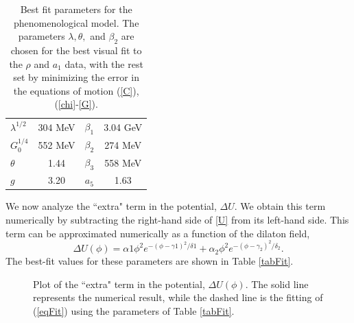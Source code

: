 \documentclass[aps,prd,12pt,nofootinbib]{revtex4}
\newcommand{\be}{\begin{equation}}
\newcommand{\ee}{\end{equation}}
\begin{document}
\begin{table}[htb]
\begin{center}
\begin{tabular}{| l | c || c | c | }
\hline
  $\lambda^{1/2}$ & $304$ MeV & $\beta_1$ & 3.04 GeV  \\
  $G_0^{1/4}$ & 552 MeV & $\beta_2$ & 274 MeV \\
  $ \theta $& 1.44 & $\beta_3$ & 558 MeV \\
  $g $& 3.20 & $a_5$ & 1.63 \\
  \hline
\end{tabular}
\caption{Best fit parameters for the phenomenological model. 
The parameters $\lambda, \theta,$ and $ \beta_2$ are chosen for the best visual fit to the $\rho$ and $a_1$ data, with the rest set by minimizing the error in the equations of motion (\ref{C}), (\ref{chi}-\ref{G}). }
\label{tabParam}
\end{center}
\end{table}


We now analyze the ``extra" term in the potential, $\Delta U$. 
We obtain this term numerically by subtracting the right-hand side of \ref{U} from its left-hand side.
This term can be approximated numerically as a function of the dilaton field, 
\be
\Delta U\left(\phi\right) = \alpha1 \phi^2 e^{-\left(\phi-\gamma1\right)^2/\delta1 } +   \alpha_2 \phi^2 e^{-\left(\phi-\gamma_2\right)^2/\delta_2 } .
\label{eqFit}
\ee
The best-fit values for these parameters are shown in Table \ref{tabFit}.

\begin{figure}[htb]
\caption{Plot of the ``extra" term in the potential, $\Delta U(\phi)$. The solid line represents the numerical result, while the dashed line is the fitting of (\ref{eqFit}) using the parameters of Table \ref{tabFit}.}
\label{figdeltaU}
\end{figure}
\end{document}
